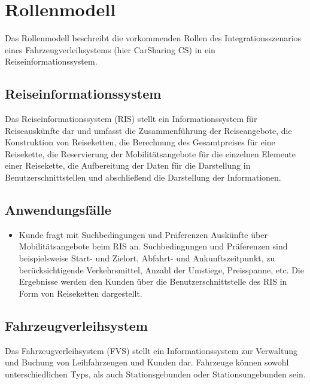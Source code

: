 \chapter{Rollenmodell}
\label{sec:Rollenmodell}

Das Rollenmodell beschreibt die vorkommenden Rollen des Integrationsszenarios eines Fahrzeugverleihsystems (hier CarSharing CS) in ein Reiseinformationssystem.

\section{Reiseinformationssystem}

Das Reiseinformationssystem (RIS) stellt ein Informationssystem für Reiseauskünfte dar und umfasst die Zusammenführung der Reiseangebote, die Konstruktion von Reiseketten, die Berechnung des Gesamtpreises für eine Reisekette, die Reservierung der Mobilitätsangebote für die einzelnen Elemente einer Reisekette, die Aufbereitung der Daten für die Darstellung in Benutzerschnittstellen und abschließend die Darstellung der Informationen.

\section{Anwendungsfälle}
\begin{itemize}
\item Kunde fragt mit Suchbedingungen und Präferenzen Auskünfte über Mobilitätsangebote beim RIS an. Suchbedingungen und Präferenzen sind beispielsweise Start- und Zielort, Abfahrt- und Ankunftszeitpunkt, zu berücksichtigende Verkehrsmittel, Anzahl der Umstiege, Preisspanne, etc. Die Ergebnisse werden den Kunden über die Benutzerschnittstelle des RIS in Form von Reiseketten dargestellt. 
\end{itemize}

\section{Fahrzeugverleihsystem}

Das Fahrzeugverleihsystem (FVS) stellt ein Informationssystem zur Verwaltung und Buchung von Leihfahrzeugen und Kunden dar. Fahrzeuge können sowohl unterschiedlichen Typs, als auch Stationsgebunden oder Stationsungebunden sein.

